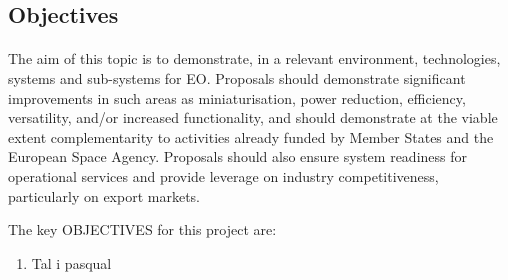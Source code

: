 \subsection{Objectives}
\paragraph{}The aim of this topic is to demonstrate, in a relevant environment, technologies, systems and sub-systems for EO. Proposals should demonstrate significant improvements in such areas as miniaturisation, power reduction, efficiency, versatility, and/or increased functionality, and should demonstrate at the viable extent complementarity to activities already funded by Member States and the European Space Agency. Proposals should also ensure system readiness for operational services and provide leverage on industry competitiveness, particularly on export markets.

The key OBJECTIVES for this project are:
\begin{enumerate}
	\item Tal i pasqual
\end{enumerate}
